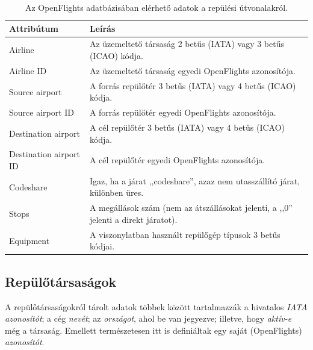     \begin{table}[ht]
      \footnotesize
      \centering
      \begin{tabular}{ | l | l |}
      \hline
      Attribútum & Leírás \\ \hline
      Airline & Az üzemeltető társaság 2 betűs (IATA) vagy 3 betűs (ICAO) kódja.\\
      Airline ID & Az üzemeltető társaság egyedi OpenFlights azonosítója.\\
      Source airport & A forrás repülőtér 3 betűs (IATA) vagy 4 betűs (ICAO) kódja.\\
      Source airport ID & A forrás repülőtér egyedi OpenFlights azonosítója.\\
      Destination airport & A cél repülőtér 3 betűs (IATA) vagy 4 betűs (ICAO) kódja.\\
      Destination airport ID & A cél repülőtér egyedi OpenFlights azonosítója.\\
      Codeshare & Igaz, ha a járat ,,codeshare'', azaz nem utasszállító járat, különben üres.\\
      Stops & A megállások szám (nem az átszállásokat jelenti, a ,,0'' jelenti a direkt járatot).\\
      Equipment & A viszonylatban használt repülőgép típusok 3 betűs kódjai.\\
      \hline
      \end{tabular}
      \caption{Az OpenFlights adatbázisában elérhető adatok a repülési útvonalakról.}
      \label{tab:table_repulesiutvonalak}
    \end{table}

    \subsection{Repülőtársaságok}
    A repülőtársaságokról tárolt adatok többek között tartalmazzák a hivatalos \textit{IATA azonosítót}; a cég \textit{nevét}; az \textit{országot}, ahol be van jegyezve; illetve, hogy \textit{aktív-e} még a társaság. Emellett természetesen itt is definiáltak egy saját (OpenFlights) \textit{azonosítót}.

